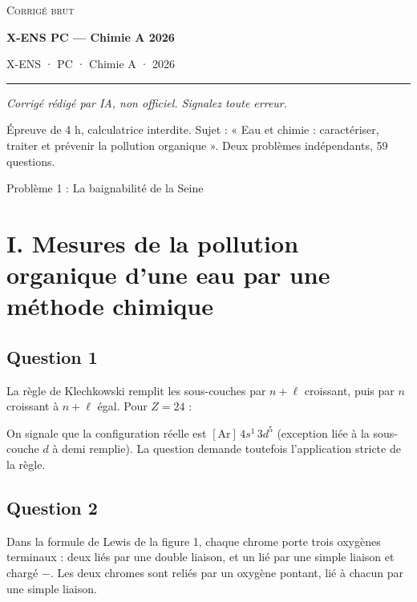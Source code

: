 \documentclass[11pt,a4paper]{article}
\newcommand{\equationajustee}[1]{%
  \sbox{\boiteequation}{$\displaystyle #1$}%
  \ifdim\wd\boiteequation>\linewidth
    \[\resizebox{\linewidth}{!}{\usebox{\boiteequation}}\]%
  \else
    \[#1\]%
  \fi}
\begin{document}
\thispagestyle{plain}
\begin{center}
  {\small\scshape Corrigé brut}\par\smallskip
  {\LARGE\bfseries X-ENS PC — Chimie A 2026\par}\medskip
  {\large X-ENS · PC · Chimie A · 2026\par}
\end{center}
\vspace{2pt}\hrule\vspace{8pt}

\emph{Corrigé rédigé par IA, non officiel. Signalez toute erreur.}

Épreuve de 4 h, calculatrice interdite. Sujet : « Eau et chimie : caractériser, traiter et prévenir la pollution organique ». Deux problèmes indépendants, 59 questions.

Problème 1 : La baignabilité de la Seine

\hypertarget{i.-mesures-de-la-pollution-organique-dune-eau-par-une-muxe9thode-chimique}{%
\section{I. Mesures de la pollution organique d'une eau par une méthode chimique}\label{i.-mesures-de-la-pollution-organique-dune-eau-par-une-muxe9thode-chimique}}

\hypertarget{question-1}{%
\subsection{Question 1}\label{question-1}}

La règle de Klechkowski remplit les sous-couches par \(n+\ell\) croissant, puis par \(n\) croissant à \(n+\ell\) égal. Pour \(Z=24\) :

\equationajustee{\boxed{\mathrm{Cr} : 1s^2\,2s^2\,2p^6\,3s^2\,3p^6\,4s^2\,3d^4}}

On signale que la configuration réelle est \([\mathrm{Ar}]\,4s^1\,3d^5\) (exception liée à la sous-couche \(d\) à demi remplie). La question demande toutefois l'application stricte de la règle.

\hypertarget{question-2}{%
\subsection{Question 2}\label{question-2}}

Dans la formule de Lewis de la figure 1, chaque chrome porte trois oxygènes terminaux : deux liés par une double liaison, et un lié par une simple liaison et chargé \(-\). Les deux chromes sont reliés par un oxygène pontant, lié à chacun par une simple liaison.
\end{document}
